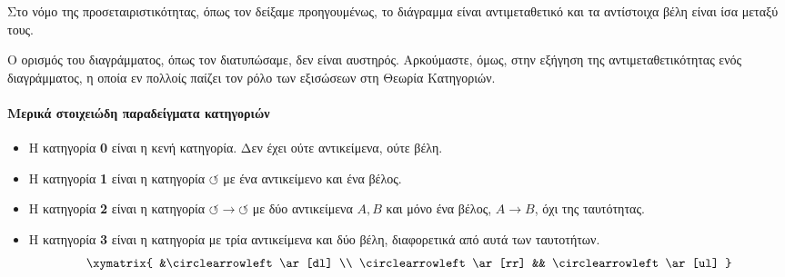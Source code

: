 \documentclass [a4paper,11pt] {book}
\theoremstyle{definition}
\theoremstyle{definition}
\newenvironment{note}[1][Σημείωση]{\begin{trivlist}
\item[\hskip \labelsep {\bfseries #1}]}{\end{trivlist}}
\begin{document}
Στο νόμο της προσεταιριστικότητας, όπως τον δείξαμε προηγουμένως, το διάγραμμα είναι αντιμεταθετικό και τα αντίστοιχα βέλη είναι ίσα μεταξύ τους.
\begin{note}
Ο ορισμός του διαγράμματος, όπως τον διατυπώσαμε, δεν είναι αυστηρός. Αρκούμαστε, όμως, στην εξήγηση της αντιμεταθετικότητας ενός διαγράμματος, η οποία εν πολλοίς παίζει τον ρόλο των εξισώσεων στη Θεωρία Κατηγοριών.
\end{note}
\paragraph{Mερικά στοιχειώδη παραδείγματα κατηγοριών}
\label{ElementaryCategories}
\begin{itemize}
\item Η κατηγορία \textbf{0} είναι η κενή κατηγορία. Δεν έχει ούτε αντικείμενα, ούτε βέλη.
\item Η κατηγορία \textbf{1} είναι η κατηγορία $ \circlearrowleft $ με ένα αντικείμενο και ένα βέλος.
\item Η κατηγορία \textbf{2} είναι η κατηγορία $ \circlearrowleft \to \circlearrowleft $ με δύο αντικείμενα $A,B$ και μόνο ένα βέλος, $A \to B$, όχι της ταυτότητας.
\item Η κατηγορία \textbf{3} είναι η κατηγορία με τρία αντικείμενα και δύο βέλη, διαφορετικά από αυτά των ταυτοτήτων.
\begin{displaymath}
\xymatrix{
&\circlearrowleft \ar[dl]  \\
\circlearrowleft \ar[rr] && \circlearrowleft \ar[ul]
}
\end{displaymath}
\end{itemize}
\end{document}
